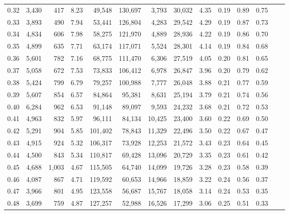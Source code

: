 \begin{tabular}{rrrrrrrrrrrrrr}
0.32 &  3,430 &    417 &    8.23 &   49,548 &  130,697 &   3,793 &  30,032 &  4.35 &  0.19 &  0.89 &      0.75 \\
0.33 &  3,893 &    490 &    7.94 &   53,441 &  126,804 &   4,283 &  29,542 &  4.29 &  0.19 &  0.87 &      0.73 \\
0.34 &  4,834 &    606 &    7.98 &   58,275 &  121,970 &   4,889 &  28,936 &  4.22 &  0.19 &  0.86 &      0.70 \\
0.35 &  4,899 &    635 &    7.71 &   63,174 &  117,071 &   5,524 &  28,301 &  4.14 &  0.19 &  0.84 &      0.68 \\
0.36 &  5,601 &    782 &    7.16 &   68,775 &  111,470 &   6,306 &  27,519 &  4.05 &  0.20 &  0.81 &      0.65 \\
0.37 &  5,058 &    672 &    7.53 &   73,833 &  106,412 &   6,978 &  26,847 &  3.96 &  0.20 &  0.79 &      0.62 \\
0.38 &  5,424 &    799 &    6.79 &   79,257 &  100,988 &   7,777 &  26,048 &  3.88 &  0.21 &  0.77 &      0.59 \\
0.39 &  5,607 &    854 &    6.57 &   84,864 &   95,381 &   8,631 &  25,194 &  3.79 &  0.21 &  0.74 &      0.56 \\
0.40 &  6,284 &    962 &    6.53 &   91,148 &   89,097 &   9,593 &  24,232 &  3.68 &  0.21 &  0.72 &      0.53 \\
0.41 &  4,963 &    832 &    5.97 &   96,111 &   84,134 &  10,425 &  23,400 &  3.60 &  0.22 &  0.69 &      0.50 \\
0.42 &  5,291 &    904 &    5.85 &  101,402 &   78,843 &  11,329 &  22,496 &  3.50 &  0.22 &  0.67 &      0.47 \\
0.43 &  4,915 &    924 &    5.32 &  106,317 &   73,928 &  12,253 &  21,572 &  3.43 &  0.23 &  0.64 &      0.45 \\
0.44 &  4,500 &    843 &    5.34 &  110,817 &   69,428 &  13,096 &  20,729 &  3.35 &  0.23 &  0.61 &      0.42 \\
0.45 &  4,688 &  1,003 &    4.67 &  115,505 &   64,740 &  14,099 &  19,726 &  3.28 &  0.23 &  0.58 &      0.39 \\
0.46 &  4,087 &    867 &    4.71 &  119,592 &   60,653 &  14,966 &  18,859 &  3.22 &  0.24 &  0.56 &      0.37 \\
0.47 &  3,966 &    801 &    4.95 &  123,558 &   56,687 &  15,767 &  18,058 &  3.14 &  0.24 &  0.53 &      0.35 \\
0.48 &  3,699 &    759 &    4.87 &  127,257 &   52,988 &  16,526 &  17,299 &  3.06 &  0.25 &  0.51 &      0.33 \\

\end{tabular}

